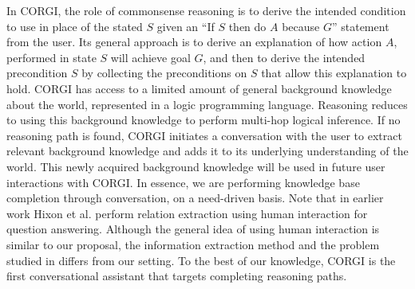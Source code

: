 In CORGI, the role of commonsense reasoning is to derive the intended condition to use in place of the stated $S$ given an ``If $S$ then do $A$ because $G$'' statement from the user. Its general approach is to derive an explanation of how action $A$, performed in state $S$ will achieve goal $G$, and then to derive the intended precondition $S$ by collecting the preconditions on $S$ that allow this explanation to hold.  CORGI has access to a limited amount of general background knowledge about the world, represented in a logic programming language. Reasoning reduces to using this background knowledge to perform multi-hop logical inference. If no reasoning path is found, CORGI initiates a conversation with the user to extract relevant background knowledge and adds it to its underlying understanding of the world.  This newly acquired background knowledge will be used in future user interactions with CORGI. In essence, we are performing knowledge base completion through conversation, on a need-driven basis. Note that in earlier work Hixon et al. \cite{hixon2015learning} perform relation extraction using human interaction for question answering. Although the general idea of using human interaction is similar to our proposal, the information extraction method and the problem studied in \cite{hixon2015learning} differs from our setting. To the best of our knowledge, CORGI is the first conversational assistant that targets completing reasoning paths.



